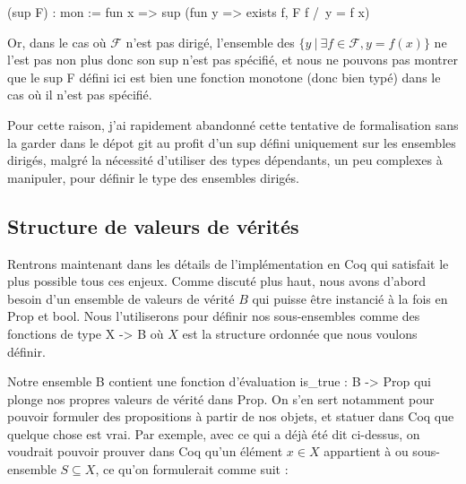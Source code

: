 \documentclass{article}
\newcommand\code[1]{{\fontfamily{lmtt}\selectfont #1}}
\theoremstyle{definition}
\begin{document}
\begin{coq}
(sup F) : mon := fun x => sup (fun y => exists f, F f /\ y = f x)
\end{coq}

Or, dans le cas où $\mathcal{F}$ n'est pas dirigé, l'ensemble des $\{y ~ | ~ \exists f \in \mathcal{F}, y = f(x)\}$ ne l'est pas non plus donc son sup n'est pas spécifié, et nous ne pouvons pas montrer que le \code{sup F} défini ici est bien une fonction monotone (donc bien typé) dans le cas où il n'est pas spécifié.

Pour cette raison, j'ai rapidement abandonné cette tentative de formalisation sans la garder dans le dépot git au profit d'un sup défini uniquement sur les ensembles dirigés, malgré la nécessité d'utiliser des types dépendants, un peu complexes à manipuler, pour définir le type des ensembles dirigés.






\subsection{Structure de valeurs de vérités}
\label{verites}

Rentrons maintenant dans les détails de l'implémentation en Coq qui satisfait le plus possible tous ces enjeux. Comme discuté plus haut, nous avons d'abord besoin d'un ensemble de valeurs de vérité $B$ qui puisse être instancié à la fois en \code{Prop} et \code{bool}. Nous l'utiliserons pour définir nos sous-ensembles comme des fonctions de type \code{X -> B} où $X$ est la structure ordonnée que nous voulons définir.

Notre ensemble B contient une fonction d'évaluation \code{is\_true : B -> Prop} qui plonge nos propres valeurs de vérité dans \code{Prop}. On s'en sert notamment pour pouvoir formuler des propositions à partir de nos objets, et statuer dans Coq que quelque chose est vrai. Par exemple, avec ce qui a déjà été dit ci-dessus, on voudrait pouvoir prouver dans Coq qu'un élément $x \in X$ appartient à ou sous-ensemble $S \subseteq X$, ce qu'on formulerait comme suit :
\end{document}
